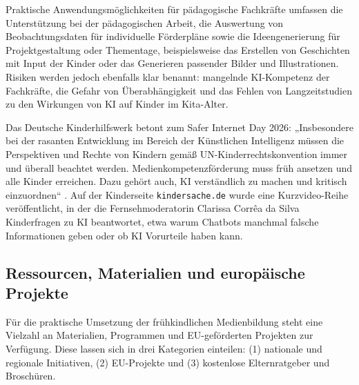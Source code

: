 \documentclass[11pt,a4paper]{article}
\begin{document}
	Praktische Anwendungsmöglichkeiten für pädagogische Fachkräfte umfassen die Unterstützung bei der pädagogischen Arbeit, die Auswertung von Beobachtungsdaten für individuelle Förderpläne sowie die Ideengenerierung für Projektgestaltung oder Thementage, beispielsweise das Erstellen von Geschichten mit Input der Kinder oder das Generieren passender Bilder und Illustrationen. Risiken werden jedoch ebenfalls klar benannt: mangelnde KI-Kompetenz der Fachkräfte, die Gefahr von Überabhängigkeit und das Fehlen von Langzeitstudien zu den Wirkungen von KI auf Kinder im Kita-Alter.
	
	Das Deutsche Kinderhilfswerk betont zum Safer Internet Day 2026: „Insbesondere bei der rasanten Entwicklung im Bereich der Künstlichen Intelligenz müssen die Perspektiven und Rechte von Kindern gemäß UN-Kinderrechtskonvention immer und überall beachtet werden. Medienkompetenzförderung muss früh ansetzen und alle Kinder erreichen. Dazu gehört auch, KI verständlich zu machen und kritisch einzuordnen“ \cite{dkhw2026}. Auf der Kinderseite \texttt{kindersache.de} wurde eine Kurzvideo-Reihe veröffentlicht, in der die Fernsehmoderatorin Clarissa Corrêa da Silva Kinderfragen zu KI beantwortet, etwa warum Chatbots manchmal falsche Informationen geben oder ob KI Vorurteile haben kann.
	
	\subsection{Ressourcen, Materialien und europäische Projekte}
	Für die praktische Umsetzung der frühkindlichen Medienbildung steht eine Vielzahl an Materialien, Programmen und EU-geförderten Projekten zur Verfügung. Diese lassen sich in drei Kategorien einteilen: (1) nationale und regionale Initiativen, (2) EU-Projekte und (3) kostenlose Elternratgeber und Broschüren.
	
\end{document}
